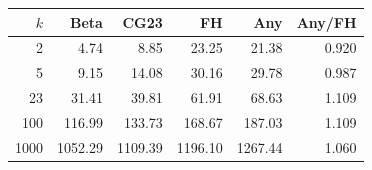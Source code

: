 \begin{tabular}{rrrrrr}
\toprule
$k$ & Beta & CG23 & FH & Any & Any/FH\\
\midrule
2 & 4.74 & 8.85 & 23.25 & 21.38 & 0.920\\
5 & 9.15 & 14.08 & 30.16 & 29.78 & 0.987\\
23 & 31.41 & 39.81 & 61.91 & 68.63 & 1.109\\
100 & 116.99 & 133.73 & 168.67 & 187.03 & 1.109\\
1000 & 1052.29 & 1109.39 & 1196.10 & 1267.44 & 1.060\\
\bottomrule
\end{tabular}
